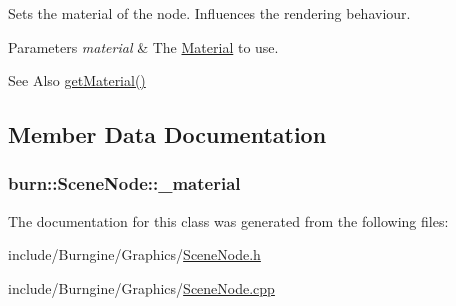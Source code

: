 Sets the material of the node. Influences the rendering behaviour. 


\begin{DoxyParams}{Parameters}
{\em material} & The \hyperlink{classburn_1_1_material}{Material} to use.\\
\hline
\end{DoxyParams}
\begin{DoxySeeAlso}{See Also}
\hyperlink{classburn_1_1_scene_node_a90bbe26a50c9039986bb60b52fd82a7d}{get\-Material()} 
\end{DoxySeeAlso}


\subsection{Member Data Documentation}
\hypertarget{classburn_1_1_scene_node_a8474c310dafc48e860ebb5ed7ecc7f8f}{
\subsubsection[{\-\_\-material}]{ burn\-::\-Scene\-Node\-::\-\_\-material\hspace{0.3cm}{\ttfamily [protected]}}}\label{classburn_1_1_scene_node_a8474c310dafc48e860ebb5ed7ecc7f8f}


The documentation for this class was generated from the following files\-:\begin{DoxyCompactItemize}
\item 
include/\-Burngine/\-Graphics/\hyperlink{_scene_node_8h}{Scene\-Node.\-h}\item 
include/\-Burngine/\-Graphics/\hyperlink{_scene_node_8cpp}{Scene\-Node.\-cpp}\end{DoxyCompactItemize}
